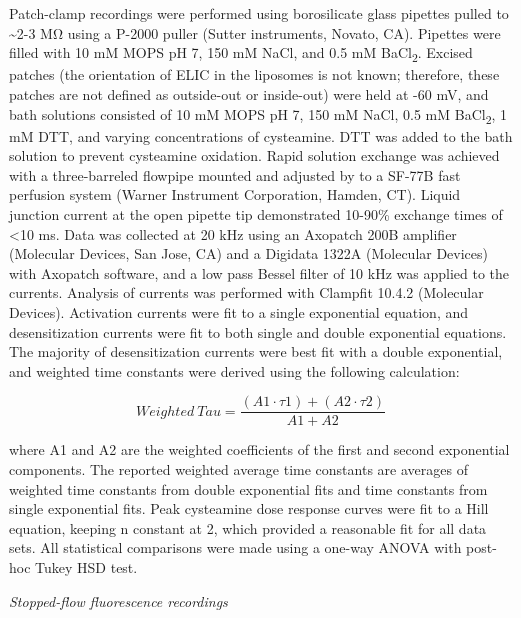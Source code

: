 Patch-clamp recordings were performed using borosilicate glass pipettes
pulled to \textasciitilde{}2-3 MΩ using a P-2000 puller (Sutter
instruments, Novato, CA). Pipettes were filled with 10 mM MOPS pH 7, 150
mM NaCl, and 0.5 mM BaCl\textsubscript{2}. Excised patches (the
orientation of ELIC in the liposomes is not known; therefore, these
patches are not defined as outside-out or inside-out) were held at -60
mV, and bath solutions consisted of 10 mM MOPS pH 7, 150 mM NaCl, 0.5 mM
BaCl\textsubscript{2}, 1 mM DTT, and varying concentrations of
cysteamine. DTT was added to the bath solution to prevent cysteamine
oxidation. Rapid solution exchange was achieved with a three-barreled
flowpipe mounted and adjusted by to a SF-77B fast perfusion system
(Warner Instrument Corporation, Hamden, CT). Liquid junction current at
the open pipette tip demonstrated 10-90\% exchange times of
\textless{}10 ms. Data was collected at 20 kHz using an Axopatch 200B
amplifier (Molecular Devices, San Jose, CA) and a Digidata 1322A
(Molecular Devices) with Axopatch software, and a low pass Bessel filter
of 10 kHz was applied to the currents. Analysis of currents was
performed with Clampfit 10.4.2 (Molecular Devices). Activation currents
were fit to a single exponential equation, and desensitization currents
were fit to both single and double exponential equations. The majority
of desensitization currents were best fit with a double exponential, and
weighted time constants were derived using the following calculation:

\[Weighted\ Tau = \frac{\left( A1 \cdot \tau 1 \right) + (A2 \cdot \tau 2)}{A1 + A2}\]

where A1 and A2 are the weighted coefficients of the first and second
exponential components. The reported weighted average time constants are
averages of weighted time constants from double exponential fits and
time constants from single exponential fits. Peak cysteamine dose
response curves were fit to a Hill equation, keeping n constant at 2,
which provided a reasonable fit for all data sets. All statistical
comparisons were made using a one-way ANOVA with post-hoc Tukey HSD
test.

\emph{Stopped-flow fluorescence recordings}

